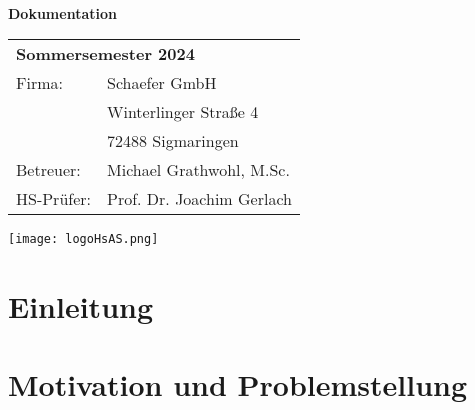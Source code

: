 \documentclass[
	ngerman,
	a4paper,
	twoside
]{scrbook}
\begin{document}
\begin{titlepage}
	\begin{center}
	\vspace*{1cm}
		{\Huge\bfseries\doctitle\\[1em]\large Dokumentation}
	\vspace{1cm}
		\date{\today} %
		
		\docauthor
	\end{center}

	\vspace*{90mm}

	\begin{tabular}{ ll }
		\multicolumn{2}{l}{\textbf{Sommersemester 2024}} \\
		Firma: &  Schaefer GmbH\\
	   	& Winterlinger Straße 4\\
		& 72488 Sigmaringen\\
		Betreuer: & Michael Grathwohl, M.Sc.\\
		HS-Prüfer: & Prof. Dr. Joachim Gerlach
	\end{tabular}
	\vspace{0.5cm}
	\begin{flushright}
    	\texttt{[image: logoHsAS.png]}
	\end{flushright}	
\end{titlepage}




	\tableofcontents
	\listoffigures
	\listoftables
	\ifdeutsch
	\else
	\fi
	\printacronyms	


\chapter{Einleitung}
	
	
\chapter{Motivation und Problemstellung}	

	
\end{document}
